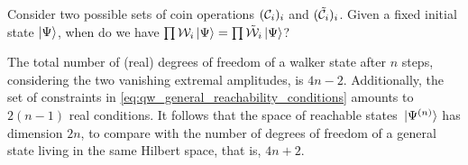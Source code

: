 Consider two possible sets of coin operations $({\mathcal{C}}_i)_i$ and $(\tilde{{\mathcal{C}}}_i)_i$. Given a fixed initial state $\ket{\Psi}$, when do we have $\prod{\mathcal{W}}_i\ket\Psi=\prod\tilde{{\mathcal{W}}}_i\ket\Psi$?

The total number of (real) degrees of freedom of a walker state after $n$ steps, considering the two vanishing extremal amplitudes, is $4n - 2$.
Additionally, the set of constraints in \cref{eq:qw_general_reachability_conditions} amounts to $2(n-1)$ real conditions.
It follows that the space of reachable states $\ket*{\Psi^{(n)}}$ has dimension $2n$, to compare with the number of degrees of freedom of a general state living in the same Hilbert space, that is, $4n + 2$.


